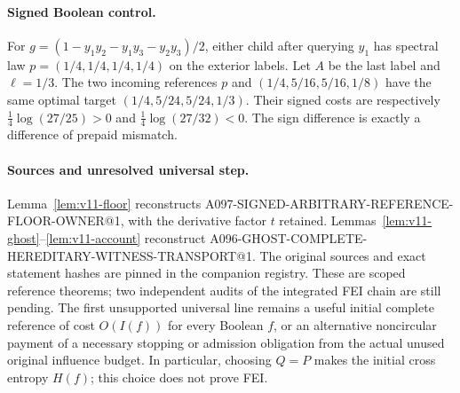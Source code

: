 \paragraph{Signed Boolean control.}
For $g=(1-y_1y_2-y_1y_3-y_2y_3)/2$, either child after querying $y_1$ has
spectral law $p=(1/4,1/4,1/4,1/4)$ on the exterior labels.
Let $A$ be the last label and $\ell=1/3$. The two incoming references
$p$ and $(1/4,5/16,5/16,1/8)$ have the same optimal target
$(1/4,5/24,5/24,1/3)$. Their signed costs are respectively
$\frac14\log(27/25)>0$ and $\frac14\log(27/32)<0$.
The sign difference is exactly a difference of prepaid mismatch.

\paragraph{Sources and unresolved universal step.}
Lemma~\ref{lem:v11-floor} reconstructs A097-SIGNED-ARBITRARY-REFERENCE-FLOOR-OWNER@1,
with the derivative factor $t$ retained. Lemmas~\ref{lem:v11-ghost}--\ref{lem:v11-account}
reconstruct A096-GHOST-COMPLETE-HEREDITARY-WITNESS-TRANSPORT@1.
The original sources and exact statement hashes are pinned in the companion registry.
These are scoped reference theorems; two independent audits of the integrated FEI
chain are still pending. The first unsupported universal line remains a useful
initial complete reference of cost $O(I(f))$ for every Boolean $f$, or an alternative
noncircular payment of a necessary stopping or admission obligation from the actual
unused original influence budget. In particular, choosing $Q=P$ makes the initial
cross entropy $H(f)$; this choice does not prove FEI.
